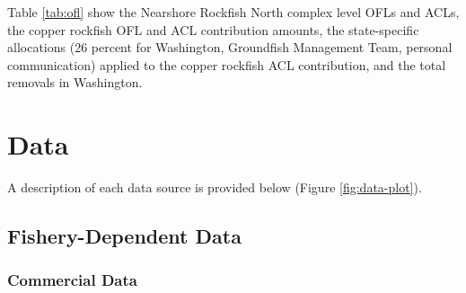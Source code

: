 \documentclass[11pt,
  english,
  a4paper,
]{article}
\begin{document}
\leavevmode\tagmcend\tagstructend\par


Table \ref{tab:ofl} show the Nearshore Rockfish North complex level OFLs and ACLs, the copper rockfish OFL and ACL contribution amounts, the state-specific allocations (26 percent for Washington, Groundfish Management Team, personal communication) applied to the copper rockfish ACL contribution, and the total removals in Washington.

\leavevmode\tagmcend\tagstructend\par


\hypertarget{data}{%
\section{Data}\label{data}}

\leavevmode\tagmcend\tagstructend


A description of each data source is provided below (Figure \ref{fig:data-plot}).

\leavevmode\tagmcend\tagstructend\par


\hypertarget{fishery-dependent-data}{%
\subsection{Fishery-Dependent Data}\label{fishery-dependent-data}}

\leavevmode\tagmcend\tagstructend


\hypertarget{commercial-data}{%
\subsubsection{Commercial Data}\label{commercial-data}}

\leavevmode\tagmcend\tagstructend

\end{document}

